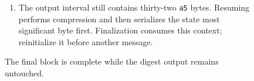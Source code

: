 \begin{figure}[htbp]
\begin{minipage}{\linewidth}
\begin{enumerate}
      \item The output interval still contains thirty-two \texttt{a5} bytes. Resuming performs compression and then serializes the state most significant byte first. Finalization consumes this context; reinitialize it before another message.
    \end{enumerate}
  \end{minipage}
  \caption{The final block is complete while the digest output remains untouched.}
  \label{capture:025-sha256-f03}
  \label{sha-f03}
\end{figure}
\par

